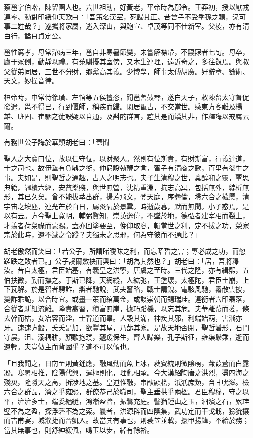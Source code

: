 
\begin{pinyinscope}
蔡邕字伯喈，陳留圉人也。六世祖勳，好黃老，平帝時為郿令。王莽初，授以厭戎連率。勳對印綬仰天歎曰：「吾策名漢室，死歸其正。昔曾子不受季孫之賜，況可事二姓哉？」遂攜將家屬，逃入深山，與鮑宣、卓茂等同不仕新室。父棱，亦有清白行，謚曰貞定公。

邕性篤孝，母常滯病三年，邕自非寒暑節變，未嘗解襟帶，不寢寐者七旬。母卒，廬于冢側，動靜以禮。有菟馴擾其室傍，又木生連理，遠近奇之，多往觀焉。與叔父從弟同居，三世不分財，鄉黨高其義。少博學，師事太傅胡廣。好辭章、數術、天文，妙操音律。

桓帝時，中常侍徐璜、左悺等五侯擅恣，聞邕善鼓琴，遂白天子，敕陳留太守督促發遣。邕不得已，行到偃師，稱疾而歸。閑居翫古，不交當世。感東方客難及楊雄、班固、崔駰之徒設疑以自通，及斟酌群言，韙其是而矯其非，作釋誨以戒厲云爾。

有務世公子誨於華顛胡老曰：「蓋聞

聖人之大寶曰位，故以仁守位，以財聚人。然則有位斯貴，有財斯富，行義達道，士之司也。故伊摯有負鼎之衒，仲尼設執鞭之言，甯子有清商之歌，百里有豢牛之事。夫如是，則聖哲之通趣，古人之明志也。夫子生清穆之世，稟醇和之靈，覃思典籍，韞櫝六經，安貧樂賤，與世無營，沈精重淵，抗志高冥，包括無外，綜析無形，其已久矣。曾不能拔萃出群，揚芳飛文，登天庭，序彝倫，埽六合之穢慝，清宇宙之埃塵，連光芒於白日，屬炎氣於景雲。時逝歲暮，默而無聞。小子惑焉，是以有云。方今聖上寬明，輔弼賢知，崇英逸偉，不墜於地，德弘者建宰相而裂土，才羨者荷榮祿而蒙賜。盍亦回塗要至，俛仰取容，輯當世之利，定不拔之功，榮家宗於此時，遺不滅之令蹤？夫獨未之思邪，何為守彼而不通此？」

胡老傲然而笑曰：「若公子，所謂睹曖昧之利，而忘昭晢之害；專必成之功，而忽蹉跌之敗者已。」公子謖爾斂袂而興曰：「胡為其然也？」胡老曰：「居，吾將釋汝。昔自太極，君臣始基，有羲皇之洪寧，唐虞之至時。三代之隆，亦有緝熙，五伯扶微，勤而撫之。于斯已降，天網縱，人紘弛，王塗壞，太極陀，君臣土崩，上下瓦解。於是智者騁詐，辯者馳說，武夫奮略，戰士講銳。電駭風馳，霧散雲披，變詐乖詭，以合時宜。或畫一策而綰萬金，或談崇朝而錫瑞珪。連衡者六印磊落，合從者駢組流離。隆貴翕習，積富無崖，據巧蹈機，以忘其危。夫華離蔕而萎，條去幹而枯，女冶容而淫，士背道而辜。人毀其滿，神疾其邪，利端始萌，害漸亦牙。速速方轂，夭夭是加，欲豐其屋，乃蔀其家。是故天地否閉，聖哲潛形，石門守晨，沮、溺耦耕，顏歜抱璞，蘧瑗保生，齊人歸樂，孔子斯征，雍渠驂乘，逝而遺輕。夫豈傲主而背國乎？道不可以傾也。

「且我聞之，日南至則黃鍾應，融風動而魚上冰，蕤賓統則微陰萌，蒹葭蒼而白露凝。寒暑相推，陰陽代興，運極則化，理亂相承。今大漢紹陶唐之洪烈，盪四海之殘災，隆隱天之高，拆渉地之基。皇道惟融，帝猷顯桧，汦汦庶類，含甘吮滋。檢六合之群品，濟之乎雍熙，群僚恭己於職司，聖主垂拱乎兩楹。君臣穆穆，守之以平，濟濟多士，端委縉綎，鴻漸盈階，振鷺充庭。譬猶鍾山之玉，泗濱之石，累珪璧不為之盈，探浮磬不為之索。曩者，洪源辟而四隩集，武功定而干戈戢，獫狁攘而吉甫宴，城濮捷而晉凱入。故當其有事也，則蓑笠並載，擐甲揚鋒，不給於務；當其無事也，則舒紳緩佩，鳴玉以步，綽有餘裕。


\end{pinyinscope}

